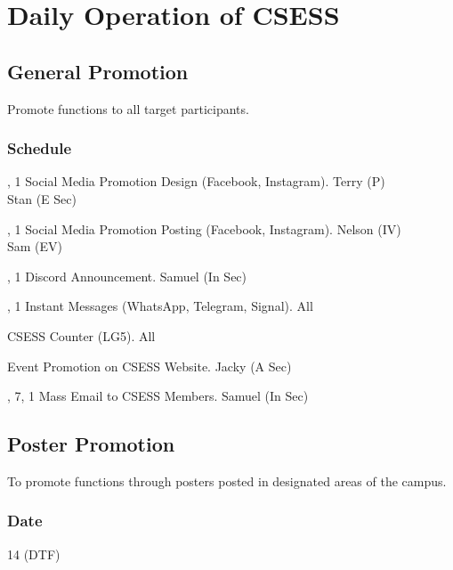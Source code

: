 \section{Daily Operation of CSESS}

\subsection{General Promotion}
Promote functions to all target participants.

\subsubsection{Schedule}

\setupTABLE[c][1][width=1.25in]
\setupTABLE[c][2][width=3.5in]
\setupTABLE[c][3][width=1.25in]
\bTABLE
\bTABLEhead

\bTR\bTH {}
\eTH\bTH {}
\eTH\bTH {}
\eTH\eTR

\eTABLEhead
\bTABLEbody

\bTR{}, 1
\eTD\bTD Social Media Promotion Design (Facebook, Instagram).
\eTD\bTD Terry (P) \\ Stan (E Sec)
\eTD\eTR

\bTR{}, 1
\eTD\bTD Social Media Promotion Posting (Facebook, Instagram).
\eTD\bTD Nelson (IV) \\ Sam (EV)
\eTD\eTR

\bTR{}, 1
\eTD\bTD Discord Announcement.
\eTD\bTD Samuel (In Sec)
\eTD\eTR

\bTR{}, 1
\eTD\bTD Instant Messages (WhatsApp, Telegram, Signal).
\eTD\bTD All
\eTD\eTR

\bTR{}
\eTD\bTD CSESS Counter (LG5).
\eTD\bTD All
\eTD\eTR

\bTR{}
\eTD\bTD Event Promotion on CSESS Website.
\eTD\bTD Jacky (A Sec)
\eTD\eTR

\bTR{}, 7, 1
\eTD\bTD Mass Email to CSESS Members.
\eTD\bTD Samuel (In Sec)
\eTD\eTR

\eTABLEbody
\eTABLE

\subsection{Poster Promotion}
To promote functions through posters posted in designated areas of the campus.

\subsubsection{Date}
14 (DTF)

